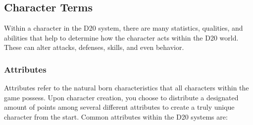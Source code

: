 \documentclass[12pt,a4paper]{report}
\begin{document}
		\subsection{Character Terms}
			Within a character in the D20 system, there are many statistics, qualities, and abilities that help to determine how the character acts within the D20 world. These can alter attacks, defenses, skills, and even behavior.
		\subsubsection{Attributes}
			Attributes refer to the natural born characteristics that all characters within the game possess. Upon character creation, you choose to distribute a designated amount of points among several different attributes to create a truly unique character from the start. 
			Common attributes within the D20 systems are:
\end{document}
